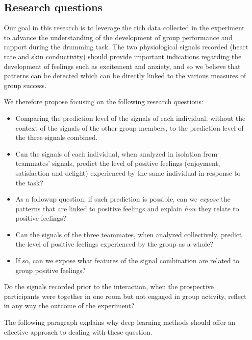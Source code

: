 \documentclass[a4paper, 11pt]{article}      %
\begin{document}
\subsection{Research questions}
Our goal in this research is to leverage the rich data collected in the experiment to advance the understanding of the development of group performance and rapport during the drumming task. The two physiological signals recorded (heart rate and skin conductivity) should provide important indications regarding the development of feelings such as excitement and anxiety, and so we believe that patterns can be detected which can be directly linked to the various measures of group success. 

We therefore propose focusing on the following research questions:
\begin{itemize}
\item 
Comparing the prediction level of the signals of each individual, without the context of the signals of the other group members, to the prediction level of the three signals combined. 
\item 
Can the signals of each individual, when analyzed in isolation from teammates' signals, predict the level of positive feelings (enjoyment, satisfaction and delight) experienced by the same individual in response to the task?
\item
As a followup question, if such prediction is possible, can we \emph{expose} the patterns that are linked to positive feelings and explain \emph{how} they relate to positive feelings?
\end{itemize}

\begin{itemize}
    \item Can the signals of the three teammates, when analyzed collectively, predict the level of positive feelings experienced by the group as a whole? 
    \item If so, can we expose what features of the signal combination are related to group positive feelings?
\end{itemize}


Do the signals recorded prior to the interaction, when the prospective participants were together in one room but not engaged in group activity, reflect in any way the outcome of the experiment?


The following paragraph explains why deep learning methods should offer an effective approach to dealing with these question.
\end{document}
